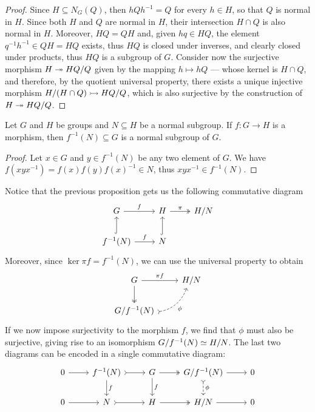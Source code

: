 \begin{proof}
Since \(H \subseteq N_G(Q)\), then \(hQh^{-1} = Q\) for every \(h \in H\), so
that \(Q\) is normal in \(H\). Since both \(H\) and \(Q\) are normal in \(H\),
their intersection \(H \cap Q\) is also normal in \(H\). Moreover, \(HQ = QH\)
and, given \(hq \in HQ\), the element \(q^{-1} h^{-1} \in Q H = H Q\) exists, thus
\(HQ\) is closed under inverses, and clearly closed under products, thus \(HQ\)
is a subgroup of \(G\). Consider now the surjective morphism \(H \twoheadrightarrow H Q / Q\)
given by the mapping \(h \mapsto h Q\) --- whose kernel is \(H \cap Q\), and
therefore, by the quotient universal property, there exists a unique injective
morphism \(H/(H \cap Q) \rightarrowtail HQ/Q\), which is also surjective by the
construction of \(H \twoheadrightarrow H Q / Q\).
\end{proof}

\begin{proposition}
\label{prop:morphisms-preserve-normality}
Let \(G\) and \(H\) be groups and \(N \subseteq H\) be a normal subgroup. If
\(f: G \to H\) is a morphism, then \(f^{-1}(N) \subseteq G\) is a normal
subgroup of \(G\).
\end{proposition}

\begin{proof}
Let \(x \in G\) and \(y \in f^{-1}(N)\) be any two element of \(G\). We have
\(f(x y x^{-1}) = f(x) f(y) f(x)^{-1} \in N\), thus \(x y x^{-1} \in f^{-1}(N)\).
\end{proof}

Notice that the previous proposition gets us the following commutative diagram
\[
  \begin{tikzcd}
    G \ar[r, "f"] &H \ar[r, two heads, "\pi"] &H/N \\
    f^{-1}(N) \ar[u, hook] \ar[r, "f"] &N \ar[u, hook]
  \end{tikzcd}
\]
Moreover, since \(\ker \pi f = f^{-1}(N)\), we can use the universal property to
obtain
\[
  \begin{tikzcd}
    G \ar[d, two heads] \ar[r, "\pi f"] &H/N \\
    G/f^{-1}(N) \ar[ru, swap, tail, bend right, dashed, "\phi"] &
  \end{tikzcd}
\]
If we now impose surjectivity to the morphism \(f\), we find that \(\phi\) must
also be surjective, giving rise to an isomorphism \(G/f^{-1}(N) \simeq H/N\). The
last two diagrams can be encoded in a single commutative diagram:
\[
  \begin{tikzcd}
    0 \ar[r]
    &f^{-1}(N) \ar[d, "f"] \ar[r, tail]
    &G \ar[d, "f"] \ar[r, two heads]
    &G/f^{-1}(N) \ar[r] \ar[d, dashed, tail, "\phi"]
    &0 \\
    0 \ar[r]
    &N \ar[r, tail]
    &H \ar[r, two heads]
    &H/N \ar[r]
    &0
  \end{tikzcd}
\]

